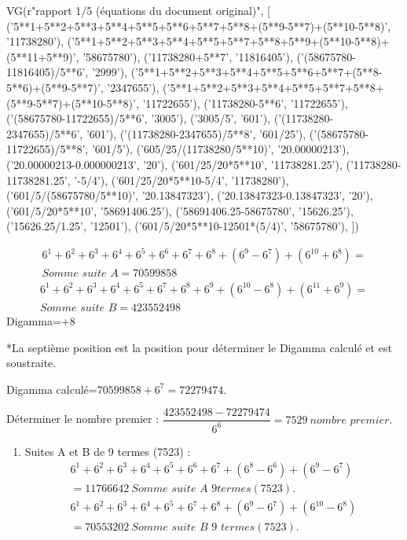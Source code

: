 \documentclass[11pt,a4paper]{article}
\begin{document}
\begin{pycode}
VG(r"rapport 1/5 (équations du document original)", [
  ('5**1+5**2+5**3+5**4+5**5+5**6+5**7+5**8+(5**9-5**7)+(5**10-5**8)', '11738280'),
  ('5**1+5**2+5**3+5**4+5**5+5**7+5**8+5**9+(5**10-5**8)+(5**11+5**9)', '58675780'),
  ('11738280+5**7', '11816405'),
  ('(58675780-11816405)/5**6', '2999'),
  ('5**1+5**2+5**3+5**4+5**5+5**6+5**7+(5**8-5**6)+(5**9-5**7)', '2347655'),
  ('5**1+5**2+5**3+5**4+5**5+5**7+5**8+(5**9-5**7)+(5**10-5**8)', '11722655'),
  ('11738280-5**6', '11722655'),
  ('(58675780-11722655)/5**6', '3005'),
  ('3005/5', '601'),
  ('(11738280-2347655)/5**6', '601'),
  ('(11738280-2347655)/5**8', '601/25'),
  ('(58675780-11722655)/5**8', '601/5'),
  ('605/25/(11738280/5**10)', '20.00000213'),
  ('20.00000213-0.000000213', '20'),
  ('601/25/20*5**10', '11738281.25'),
  ('11738280-11738281.25', '-5/4'),
  ('601/25/20*5**10-5/4', '11738280'),
  ('601/5/(58675780/5**10)', '20.13847323'),
  ('20.13847323-0.13847323', '20'),
  ('601/5/20*5**10', '58691406.25'),
  ('58691406.25-58675780', '15626.25'),
  ('15626.25/1.25', '12501'),
  ('601/5/20*5**10-12501*(5/4)', '58675780'),
])
\end{pycode}


\begin{gather*}
6^{1}+6^{2}+6^{3}+6^{4}+6^{5}+6^{6}+6^{7}+6^{8}+(6^{9}-6^{7})+(6^{10}+6^{8})=\\
\textit{Somme suite A}=70599858
\end{gather*}
\begin{gather*}
6^{1}+6^{2}+6^{3}+6^{4}+6^{5}+6^{7}+6^{8}+6^{9}+(6^{10}-6^{8})+(6^{11}+6^{9})=\\
\textit{Somme suite B}=423552498
\end{gather*}
Digamma=+8

*La septième position est la position pour déterminer le Digamma calculé et est soustraite.

Digamma calculé=$70599858+6^{7}=72279474$.

Déterminer le nombre premier : $\dfrac{423552498-72279474}{6^{6}}=7529\ \textit{nombre premier.}$

\begin{enumerate}[label=\arabic*.,leftmargin=*,itemsep=6pt]
\item Suites A et B de 9 termes (7523) :
\begin{gather*}
6^{1}+6^{2}+6^{3}+6^{4}+6^{5}+6^{6}+6^{7}+(6^{8}-6^{6})+(6^{9}-6^{7})\\
=11766642\ \textit{Somme suite A 9termes}(7523).\\
6^{1}+6^{2}+6^{3}+6^{4}+6^{5}+6^{7}+6^{8}+(6^{9}-6^{7})+(6^{10}-6^{8})\\
=70553202\ \textit{Somme suite B 9 termes}(7523).
\end{gather*}
\end{enumerate}
\end{document}
